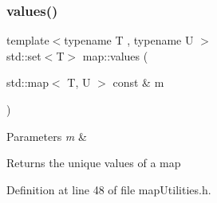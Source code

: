 \subsubsection{\texorpdfstring{values()}{values()}}
{\footnotesize\ttfamily template$<$typename T , typename U $>$ \\
std\+::set$<$T$>$ map\+::values (\begin{DoxyParamCaption}\item[{std\+::map$<$ T, U $>$ const \&}]{m }\end{DoxyParamCaption})}


\begin{DoxyParams}{Parameters}
{\em m} & \\
\hline
\end{DoxyParams}
\begin{DoxyReturn}{Returns}
the unique values of a map 
\end{DoxyReturn}


Definition at line 48 of file map\+Utilities.\+h.

